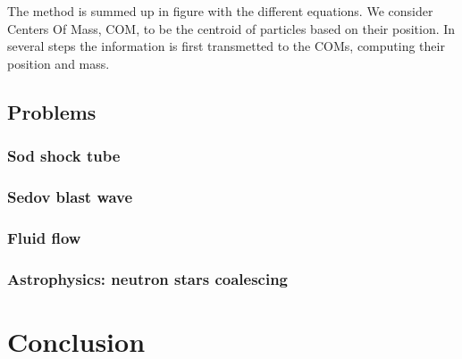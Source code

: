  \begin{figure}
 \end{figure}

The method is summed up in figure with the different equations.
We consider Centers Of Mass, COM, to be the centroid of particles based on their position. 
In several steps the information is first transmetted to the COMs, computing their position and mass. 


\subsection{Problems} 

\subsubsection{Sod shock tube}

\subsubsection{Sedov blast wave}

\subsubsection{Fluid flow}

\subsubsection{Astrophysics: neutron stars coalescing}

\section{Conclusion}
